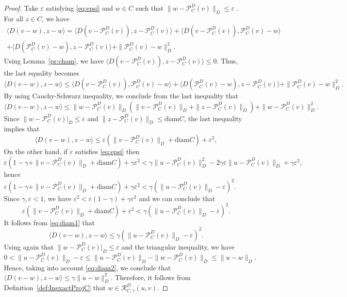 \begin{proof}
	Take $\varepsilon$ satisfying \eqref{eq:epsi} and $w\in C$ such that  $\|w-\mathcal{P}_C^D(v)\|_D\leq \varepsilon$ . For all $z\in C$, we have
	\begin{multline*}
		\langle D(v-w), z-w \rangle = \langle D(v-\mathcal{P}_C^D(v)),z-\mathcal{P}_C^D(v) \rangle + \langle D(v-\mathcal{P}_C^D(v)), \mathcal{P}_C^D(v) -w \rangle\\
		+ \langle D(\mathcal{P}_C^D(v) - w), z- \mathcal{P}_C^D(v) \rangle +\| \mathcal{P}_C^D(v)-w\|_D^2.
	\end{multline*}
	Using Lemma~\ref{pr:cham},  we have $\langle D(v-\mathcal{P}_C^D(v)),z-\mathcal{P}_C^D(v) \rangle\leq 0$. Thus, the last equality becomes
	$$
		\langle D(v-w), z-w \rangle \leq \langle D(v-\mathcal{P}_C^D(v)), \mathcal{P}_C^D(v) -w \rangle + \langle D(\mathcal{P}_C^D(v) - w), z- \mathcal{P}_C^D(v) \rangle +\| \mathcal{P}_C^D(v)-w\|_D^2.
	$$
	By using Cauchy-Schwarz inequality, we conclude from the last inequality that
	$$
		\langle D(v-w), z-w \rangle \leq  \|w-\mathcal{P}_C^D(v) \|_D\left(\|v-\mathcal{P}_C^D(v)\|_D+ \|z- \mathcal{P}_C^D(v)\|_D\right) +\|w-\mathcal{P}_C^D(v)\|_D^2.
	$$
	Since $\|w-\mathcal{P}_C^D(v)|_D\leq \varepsilon$ and $ \|z- \mathcal{P}_C^D(v)\|_D\leq \mbox{diam} C$, the last inequality implies that
	\begin{equation}\label{eq:diam1}
		\langle D(v-w), z-w \rangle \leq \varepsilon \left(\|v-\mathcal{P}_C^D(v)\|_D+\mbox{diam}C\right)+\varepsilon^2,
	\end{equation}
	On the other hand, if $\varepsilon$ satisfies \eqref{eq:epsi} then
	$$
		\varepsilon \left( 1-\gamma+\|v-\mathcal{P}_C^D(v)\|_D+ \mbox{diam} C\right) + \gamma \varepsilon^2 <
		\gamma\|u-\mathcal{P}_C^D(v)\|_D^2-2	\gamma\varepsilon\|u-\mathcal{P}_C^D(v)\|_D +\gamma\varepsilon^2,
	$$
	hence
	$
		\varepsilon \left( 1-\gamma+\|v-\mathcal{P}_C^D(v)\|_D+ \mbox{diam} C\right) + \gamma \varepsilon^2 < \gamma\left(\|u-\mathcal{P}_C^D(v)\|_D-\varepsilon\right)^2.
	$
	Since $\gamma, \varepsilon<1$, we have  $\varepsilon^2 < \varepsilon(1-\gamma) + \gamma \varepsilon^2$ and we can conclude that
	$$
		\varepsilon \left( \|v-\mathcal{P}_C^D(v)\|_D+ \mbox{diam} C\right) + \varepsilon^2 <
		\gamma\left(\|u-\mathcal{P}_C^D(v)\|_D-\varepsilon\right)^2.
	$$
	It follows from \eqref{eq:diam1} that
	\begin{equation}\label{eq:diam2}
		\langle D(v-w), z-w \rangle \leq \gamma\left(\|u-\mathcal{P}_C^D(v)\|_D-\varepsilon\right)^2.
	\end{equation}
	Using again that $\|w-\mathcal{P}_C^D(v)|_D\leq \varepsilon$ and the triangular inequality, we have
	$$
		0<\|u-\mathcal{P}_C^D(v)\|_D -\varepsilon \leq \|u-\mathcal{P}_C^D(v)\|_D -\|w-\mathcal{P}_C^D(v)\|_D \leq \|u-w\|_D.
	$$
	Hence,   taking into account  \eqref{eq:diam2}, we conclude that $	\langle D(v-w), z-w \rangle \leq \gamma\|u-w\|_D^2$. Therefore, it follows from Definition~\ref{def:InexactProjC} that    $w\in\mathcal{R}_{C,\gamma}^D(u, v)$.
\end{proof}
